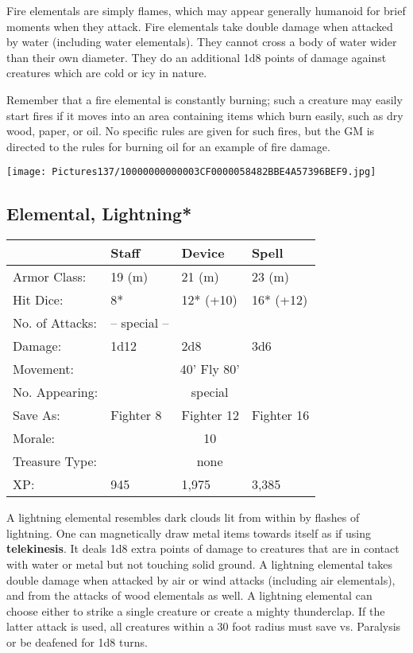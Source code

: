\documentclass[a4paper,twoside,openany,10pt]{book}
\begin{document}
\begin{multicols}{2}
Fire elementals are simply flames, which may appear generally humanoid for brief moments when they attack. Fire elementals take double damage when attacked by water (including water elementals). They cannot cross a body of water wider than their own diameter. They do an additional 1d8 points of damage against creatures which are cold or icy in nature.

Remember that a fire elemental is constantly burning; such a creature may easily start fires if it moves into an area containing items which burn easily, such as dry wood, paper, or oil. No specific rules are given for such fires, but the GM is directed to the rules for burning oil for an example of fire damage.

\begin{center}
	\texttt{[image: Pictures137/10000000000003CF0000058482BBE4A57396BEF9.jpg]}
\end{center}

\subsection*{Elemental, Lightning*}\label{elemental-lightning}

\begin{tabularx}{0.48\textwidth}{@{}lllX@{}}
& Staff & Device & Spell \\\hline
Armor Class: & 19 (m) & 21 (m) & 23 (m) \\\hline
Hit Dice: & 8* & 12* (+10) & 16* (+12) \\\hline
No. of Attacks: & -- special -- & & \\\hline
Damage: & 1d12 & 2d8 & 3d6 \\\hline
Movement:  & \multicolumn{3}{c}{40' Fly 80'}\\\hline 
No. Appearing: &\multicolumn{3}{c}{special} \\\hline
Save As: & Fighter 8 & Fighter 12 & Fighter 16 \\\hline
Morale: & \multicolumn{3}{c}{10} \\\hline
Treasure Type: & \multicolumn{3}{c}{none} \\\hline
XP: & 945 & 1,975 & 3,385 \\\hline
\end{tabularx}\medskip

A lightning elemental resembles dark clouds lit from within by flashes of lightning. One can magnetically draw metal items towards itself as if using \textbf{telekinesis}. It deals 1d8 extra points of damage to creatures that are in contact with water or metal but not touching solid ground. A lightning elemental takes double damage when attacked by air or wind attacks (including air elementals), and from the attacks of wood elementals as well. A lightning elemental can choose either to strike a single creature or create a mighty thunderclap. If the latter attack is used, all creatures within a 30 foot radius must save vs. Paralysis or be deafened for 1d8 turns.



\end{multicols}
\end{document}
